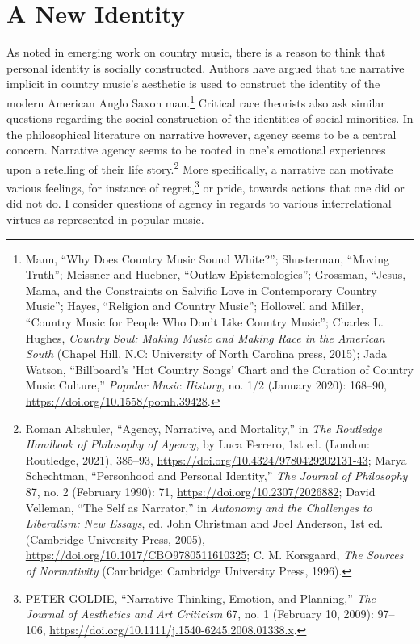 \documentclass[
  12pt,
]{book}
\theoremstyle{definition}
\theoremstyle{definition}
\theoremstyle{definition}
\theoremstyle{definition}
\theoremstyle{remark}
\begin{document}
\chapter{A New Identity}\label{a-new-identity}

As noted in emerging work on country music, there is a reason to think that personal identity is socially constructed. Authors have argued that the narrative implicit in country music's aesthetic is used to construct the identity of the modern American Anglo Saxon man.\footnote{Mann, {``Why Does Country Music Sound White?''}; Shusterman, {``Moving {Truth}''}; Meissner and Huebner, {``Outlaw Epistemologies''}; Grossman, {``Jesus, {Mama}, and the {Constraints} on {Salvific Love} in {Contemporary Country Music}''}; Hayes, {``Religion and {Country Music}''}; Hollowell and Miller, {``Country {Music} for {People Who Don}'t {Like Country Music}''}; Charles L. Hughes, \emph{Country Soul: Making Music and Making Race in the {American South}} (Chapel Hill, N.C: University of North Carolina press, 2015); Jada Watson, {``Billboard's '{Hot Country Songs}' Chart and the Curation of Country Music Culture,''} \emph{Popular Music History}, no. 1/2 (January 2020): 168--90, \url{https://doi.org/10.1558/pomh.39428}.} Critical race theorists also ask similar questions regarding the social construction of the identities of social minorities. In the philosophical literature on narrative however, agency seems to be a central concern. Narrative agency seems to be rooted in one's emotional experiences upon a retelling of their life story.\footnote{Roman Altshuler, {``Agency, Narrative, and Mortality,''} in \emph{The {Routledge Handbook} of {Philosophy} of {Agency}}, by Luca Ferrero, 1st ed. (London: Routledge, 2021), 385--93, \url{https://doi.org/10.4324/9780429202131-43}; Marya Schechtman, {``Personhood and {Personal Identity},''} \emph{The Journal of Philosophy} 87, no. 2 (February 1990): 71, \url{https://doi.org/10.2307/2026882}; David Velleman, {``The {Self} as {Narrator},''} in \emph{Autonomy and the {Challenges} to {Liberalism}: {New Essays}}, ed. John Christman and Joel Anderson, 1st ed. (Cambridge University Press, 2005), \url{https://doi.org/10.1017/CBO9780511610325}; C. M. Korsgaard, \emph{The Sources of Normativity} (Cambridge: Cambridge University Press, 1996).} More specifically, a narrative can motivate various feelings, for instance of regret,\footnote{PETER GOLDIE, {``Narrative {Thinking}, {Emotion}, and {Planning},''} \emph{The Journal of Aesthetics and Art Criticism} 67, no. 1 (February 10, 2009): 97--106, \url{https://doi.org/10.1111/j.1540-6245.2008.01338.x}.} or pride, towards actions that one did or did not do. I consider questions of agency in regards to various interrelational virtues as represented in popular music.
\end{document}
